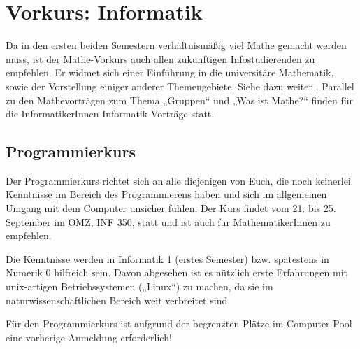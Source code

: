 \section{Vorkurs: Informatik}
\label{vkinfo}
Da in den ersten beiden Semestern verhältnismäßig viel Mathe gemacht werden muss, ist der Mathe-Vorkurs auch allen zukünftigen Infostudierenden zu empfehlen. Er widmet sich einer Einführung in die universitäre Mathematik, sowie der Vorstellung einiger anderer Themengebiete. Siehe dazu weiter
.
Parallel zu den Mathevorträgen zum Thema „Gruppen“ und „Was ist Mathe?“ finden für die InformatikerInnen Informatik-Vorträge statt.

\parskip

\subsection{Programmierkurs}
Der Programmierkurs richtet sich an alle diejenigen von Euch, die noch keinerlei Kenntnisse im Bereich des Programmierens haben und sich im allgemeinen Umgang mit dem Computer unsicher fühlen. Der Kurs findet vom 21. bis 25. September im OMZ, \gls{INF} 350, statt und ist auch für MathematikerInnen zu empfehlen.

Die Kenntnisse werden in Informatik 1 (erstes Semester) bzw. spätestens in
Numerik 0 hilfreich sein. Davon abgesehen ist es nützlich erste Erfahrungen mit
unix-artigen Betriebssystemen („Linux“) zu machen, da sie im
naturwissenschaftlichen Bereich weit verbreitet sind.

Für den Programmierkurs ist aufgrund der begrenzten Plätze im Computer-Pool
eine vorherige Anmeldung erforderlich!

